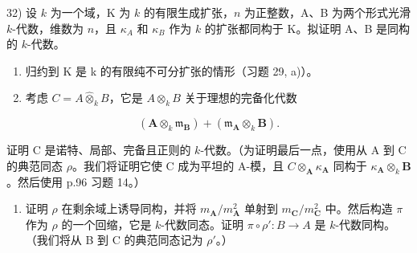 32) 设 \(k\) 为一个域，K 为 \(k\) 的有限生成扩张，\(n\) 为正整数，A、B 为两个形式光滑 \(k\)-代数，维数为 \(n\)，且 \(\kappa_{A}\) 和 \(\kappa_{B}\) 作为 \(k\) 的扩张都同构于 K。拟证明 A、B 是同构的 \(k\)-代数。

\begin{enumerate}
\def\labelenumi{\alph{enumi})}
\item
  归约到 K 是 k 的有限纯不可分扩张的情形（习题 29, a)）。
\item
  考虑 \(C = A \hat{\otimes}_{k} B\)，它是 \(A \otimes_{k} B\) 关于理想的完备化代数
\end{enumerate}

\[
\left(\mathbf {A} \otimes_ {k} \mathfrak {m} _ {\mathbf {B}}\right) + \left(\mathfrak {m} _ {\mathbf {A}} \otimes_ {k} \mathbf {B}\right).
\]

证明 C 是诺特、局部、完备且正则的 \(k\)-代数。（为证明最后一点，使用从 A 到 C 的典范同态 \(\rho\)。我们将证明它使 C 成为平坦的 A-模，且 \(C \otimes_{\mathbf{A}} \kappa_{\mathbf{A}}\) 同构于 \(\kappa_{\mathbf{A}} \otimes_{k} \mathbf{B}\)。然后使用 p.96 习题 14。）

\begin{enumerate}
\def\labelenumi{\alph{enumi})}
\setcounter{enumi}{2}
\tightlist
\item
  证明 \(\rho\) 在剩余域上诱导同构，并将 \(m_{\mathbf{A}}/m_{\mathbf{A}}^{2}\) 单射到 \(m_{\mathbf{C}}/m_{\mathbf{C}}^{2}\) 中。然后构造 \(\pi\) 作为 \(\rho\) 的一个回缩，它是 \(k\)-代数同态。证明 \(\pi \circ \rho': B \to A\) 是 \(k\)-代数同构。（我们将从 B 到 C 的典范同态记为 \(\rho'\)。）
\end{enumerate}

